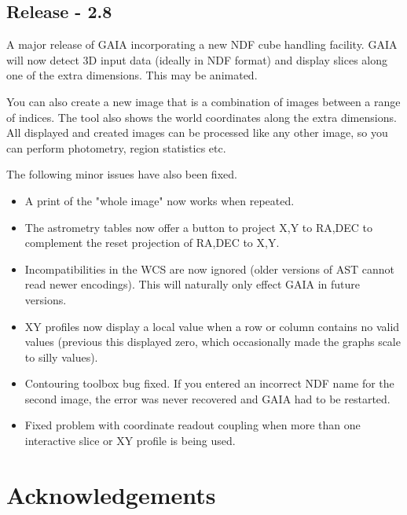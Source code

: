 \documentclass[twoside,11pt]{article}
\newcommand{\xlabel}[1]{}
\renewcommand{\_}{\texttt{\symbol{95}}}
\begin{document}
\subsection{Release - 2.8}

A major release of GAIA incorporating a new NDF cube handling facility.  GAIA
will now detect 3D input data (ideally in NDF format) and display slices along
one of the extra dimensions. This may be animated.

You can also create a new image that is a combination of images between a
range of indices. The tool also shows the world coordinates along the extra
dimensions. All displayed and created images can be processed like any other
image, so you can perform photometry, region statistics etc.

The following minor issues have also been fixed.
\begin{itemize}

    \item A print of the "whole image" now works when repeated.

    \item The astrometry tables now offer a button to project X,Y to RA,DEC
      to complement the reset projection of RA,DEC to X,Y.

    \item Incompatibilities in the WCS are now ignored (older versions of
      AST cannot read newer encodings). This will naturally only effect
      GAIA in future versions.

    \item XY profiles now display a local value when a row or column contains
      no valid values (previous this displayed zero, which occasionally
      made the graphs scale to silly values).

    \item Contouring toolbox bug fixed. If you entered an incorrect NDF name for
      the second image, the error was never recovered and GAIA had to be
      restarted.

    \item Fixed problem with coordinate readout coupling when more than one
      interactive slice or XY profile is being used.
\end{itemize}

\section{\xlabel{acknowledgements}Acknowledgements}
\end{document}
